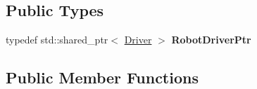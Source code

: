 \subsection*{Public Types}
\begin{DoxyCompactItemize}
\item 
typedef std\+::shared\+\_\+ptr$<$ \hyperlink{classDriver}{Driver} $>$ {\bfseries Robot\+Driver\+Ptr}\hypertarget{classrobot__interfaces_1_1MonitoredRobotDriver_a272fbf2c9bf93f568c00dd1e37e62e97}{}\label{classrobot__interfaces_1_1MonitoredRobotDriver_a272fbf2c9bf93f568c00dd1e37e62e97}

\end{DoxyCompactItemize}
\subsection*{Public Member Functions}
